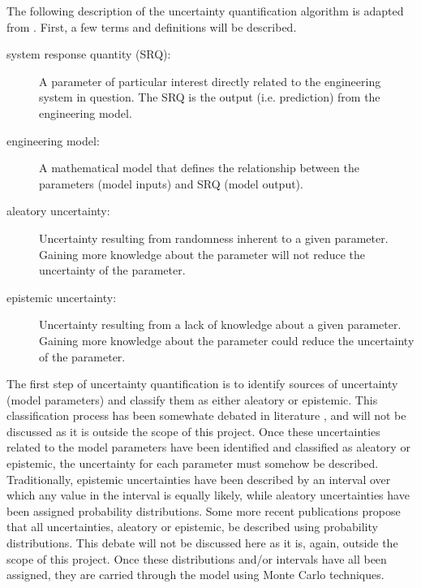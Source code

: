 \documentclass[11pt]{asaproc}\usepackage[]{graphicx}\usepackage[]{color}
\begin{document}
The following description of the uncertainty quantification algorithm is adapted from \cite{EW2018}. First, a few terms and definitions will be described. 

\begin{description}
\item[system response quantity (SRQ):] A parameter of particular interest directly related to the engineering system in question. The SRQ is the output (i.e. prediction) from the engineering model.
\item[engineering model:] A mathematical model that defines the relationship between the parameters (model inputs) and SRQ (model output). 
\item[aleatory uncertainty:] Uncertainty resulting from randomness inherent to a given parameter. Gaining more knowledge about the parameter will not reduce the uncertainty of the parameter. 
\item[epistemic uncertainty:] Uncertainty resulting from a lack of knowledge about a given parameter. Gaining more knowledge about the parameter could reduce the uncertainty of the parameter. 
\end{description}

The first step of uncertainty quantification is to identify sources of uncertainty (model parameters) and classify them as either aleatory or epistemic. This classification process has been somewhate debated in literature \citep{KD2009}, and will not be discussed as it is outside the scope of this project. Once these uncertainties related to the model parameters have been identified and classified as aleatory or epistemic, the uncertainty for each parameter must somehow be described. Traditionally, epistemic uncertainties have been described by an interval over which any value in the interval is equally likely, while aleatory uncertainties have been assigned probability distributions. Some more recent publications \citep{EW2018} propose that all uncertainties, aleatory or epistemic, be described using probability distributions. This debate will not be discussed here as it is, again, outside the scope of this project. Once these distributions and/or intervals have all been assigned, they are carried through the model using Monte Carlo techniques.
\end{document}
